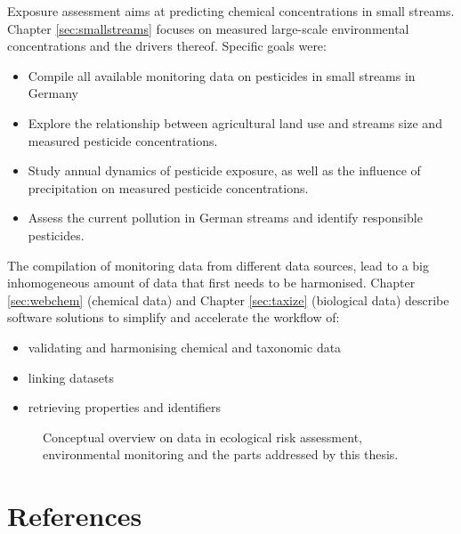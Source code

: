 \noindent Exposure assessment aims at predicting chemical concentrations in small streams. 
Chapter \ref{sec:smallstreams} focuses on measured large-scale environmental concentrations and the drivers thereof. 
Specific goals were:
\begin{itemize}
	\item Compile all available monitoring data on pesticides in small streams in Germany
	\item Explore the relationship between agricultural land use and streams size and measured pesticide concentrations.
	\item Study annual dynamics of pesticide exposure, as well as the influence of precipitation on measured pesticide concentrations.
	\item Assess the current pollution in German streams and identify responsible pesticides.
\end{itemize}

\noindent
The compilation of monitoring data from different data sources, lead to a big inhomogeneous amount of data that first needs to be harmonised.
Chapter \ref{sec:webchem} (chemical data) and Chapter \ref{sec:taxize} (biological data) describe software solutions to simplify and accelerate the workflow of:

\begin{itemize}
	\item validating and harmonising chemical and taxonomic data
	\item linking datasets
	\item retrieving properties and identifiers
\end{itemize}


\begin{figure}
	\resizebox{1\textwidth}{!}{%
		
	}
	\caption[Conceptual overview of the topics addressed by this thesis]{Conceptual overview on data in ecological risk assessment, environmental monitoring and the parts addressed by this thesis.}
	\label{fig:intro:overview}
\end{figure}





\newpage
\section{References}
\printbibliography[heading=none]
